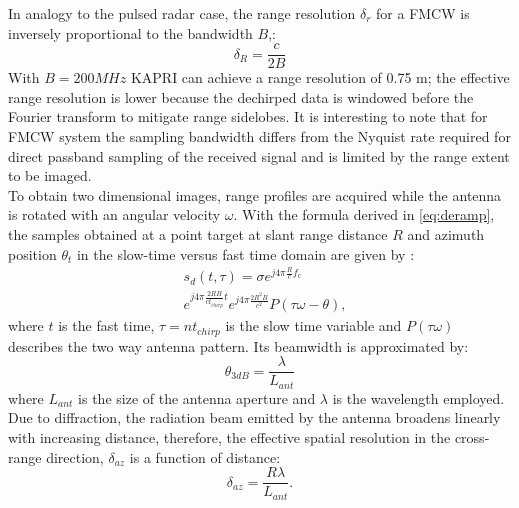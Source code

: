 In analogy to the pulsed radar case, the range resolution $\delta_{r}$ for a FMCW is inversely proportional to the bandwidth $B$,:
\begin{equation}
	\delta_R = \frac{c}{2 B}
\end{equation}
With $B=200 MHz$ KAPRI can achieve a range resolution of 0.75 m\cite{Strozzi2011}; the effective range resolution is lower because the dechirped data is windowed before the Fourier transform to mitigate range sidelobes. It is interesting to note that for FMCW system the sampling bandwidth differs from the Nyquist rate required for direct passband sampling of the received signal and is limited by the range extent to be imaged\cite{Meta2006}.\\
To obtain two dimensional images, range profiles are acquired while the antenna is rotated with an angular velocity $\omega$.
With the formula derived in \autoref{eq:deramp}, the samples obtained at a point target at slant range distance $R$ and azimuth position $\theta_{t}$ in the slow-time versus fast time domain are given by :
\begin{equation}\label{eq:signal_model}
	\begin{aligned}
	& s_{d}\left(t,\tau\right) = \sigma e^{j 4 \pi \frac{ R}{c}f_c}   \\
	& e^{j 4 \pi \frac{2 R B }{c t_{chirp}} t}  e^{j 4 \pi \frac{2 R^2 B}{c^2}} P\left(\tau \omega - \theta\right),
	\end{aligned}
\end{equation} 
where $t$ is the fast time, $\tau = n t_{chirp}$ is the slow time variable and $P\left(\tau \omega\right)$ describes the two way antenna pattern. Its beamwidth is approximated by:
\begin{equation}\label{eq:azimuth_resolution}
	\theta_{3dB} = \frac{\lambda}{L_{ant}}
\end{equation}
where $L_{ant}$ is the size of the antenna aperture and $\lambda$ is the wavelength employed.
Due to diffraction, the radiation beam emitted by the antenna broadens linearly with increasing distance,
therefore, the effective spatial resolution in the cross-range direction, $\delta_{az}$ is a function of distance:
\begin{equation}\label{eq:azimuth_ground_resolution}
	\delta_{az} = \frac{R \lambda}{L_{ant}}.
\end{equation}
